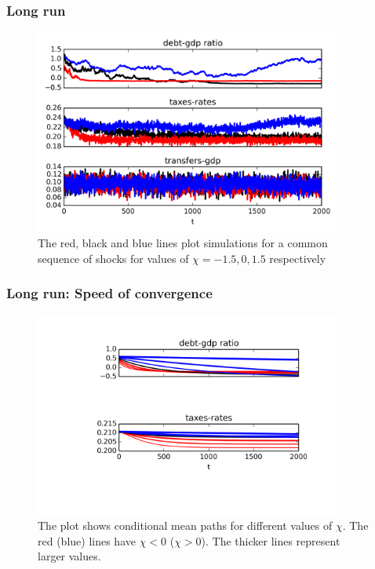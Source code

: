 \documentclass{beamer}
\begin{document}
\begin{frame}
\frametitle{Long run}
 {
  \begin{figure}
    \centering
    \includegraphics[width = 0.9\textwidth]{plots/long_simulation_debt.png}
    \caption{The red, black and blue lines plot simulations for a common sequence of shocks for values of $\chi=-1.5,0,1.5$ respectively}
  \end{figure}

}

\end{frame}


\begin{frame}
\frametitle{Long run: Speed of convergence}
 {
  \begin{figure}
    \centering
    \includegraphics[width = 0.9\textwidth]{plots/speed_of_convergence.png}
    \caption{The plot shows conditional mean paths for different values of $\chi$. The red (blue) lines have $\chi<0$ ($\chi>0$). The thicker lines represent larger values.}
  \end{figure}

}

\end{frame}
\end{document}
